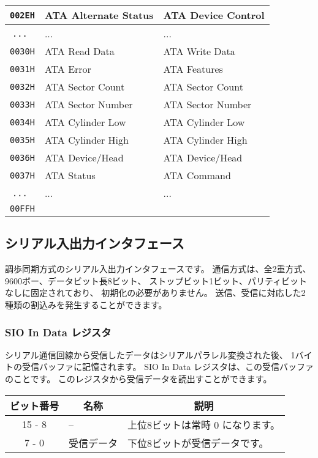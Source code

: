 \begin{center}
\begin{tabular}{|c|l|l|}
\hline
{\tt 002EH} & ATA Alternate Status & ATA Device Control \\
\hline
{\tt ...  } & ...                  & ...                \\
\hline
{\tt 0030H} & ATA Read Data        & ATA Write Data     \\
\hline
{\tt 0031H} & ATA Error            & ATA Features       \\
\hline
{\tt 0032H} & ATA Sector Count     & ATA Sector Count   \\
\hline
{\tt 0033H} & ATA Sector Number    & ATA Sector Number  \\
\hline
{\tt 0034H} & ATA Cylinder Low     & ATA Cylinder Low   \\
\hline
{\tt 0035H} & ATA Cylinder High    & ATA Cylinder High  \\
\hline
{\tt 0036H} & ATA Device/Head      & ATA Device/Head    \\
\hline
{\tt 0037H} & ATA Status           & ATA Command        \\
\hline
{\tt ...  } & ...                  & ...                \\
\hline
{\tt 00FFH} &                      &                    \\
\hline
\end{tabular}
\end{center}

\subsection{シリアル入出力インタフェース}
\label{app:sio}

調歩同期方式のシリアル入出力インタフェースです。
通信方式は、全2重方式、9600ボー、データビット長8ビット、
ストップビット1ビット、パリティビットなしに固定されており、
初期化の必要がありません。
送信、受信に対応した2種類の割込みを発生することができます。

\subsubsection{SIO In Data レジスタ}

シリアル通信回線から受信したデータはシリアルパラレル変換された後、
1バイトの受信バッファに記憶されます。
SIO In Data レジスタは、この受信バッファのことです。
このレジスタから受信データを読出すことができます。

\begin{center}
\begin{tabular}{|c|l|l|}
\hline
ビット番号 & \multicolumn{1}{|c|}{名称} & \multicolumn{1}{|c|}{説明} \\
\hline
15 - 8     &  --                        & 上位8ビットは常時 0 になります。\\
\hline
7 - 0      &  受信データ                & 下位8ビットが受信データです。\\
\hline
\end{tabular}
\end{center}

